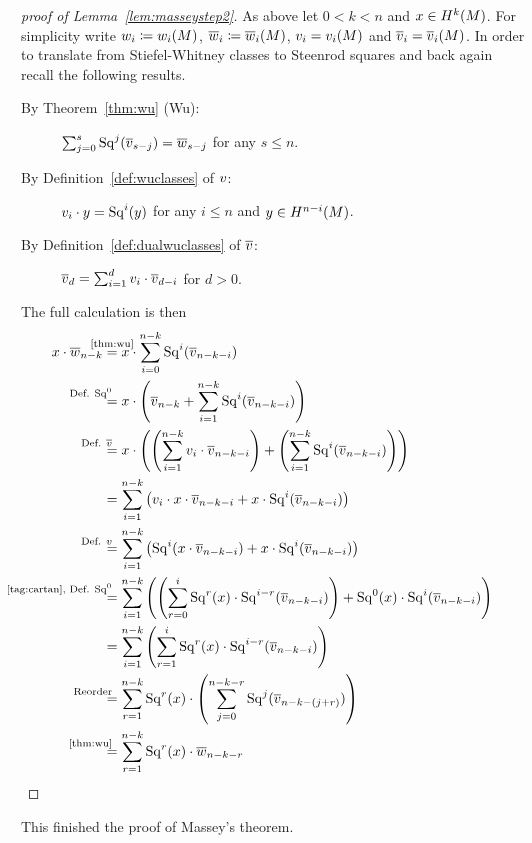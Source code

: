 \begin{proof}[proof of Lemma~\ref{lem:masseystep2}]
  As above let $0<k<n$ and $x\in H^k(M)$.
  For simplicity write
  $w_{i}\coloneqq{w_{i}}(M)$, $\overline{w}_{i}\coloneqq{\overline{w}_{i}}(M)$,
  $v_{i} = {v_{i}}(M)$ and $\overline{v}_{i} = {\overline{v}_{i}}(M)$.
  In order to translate from Stiefel-Whitney classes to Steenrod
  squares and back again recall the following results.
  \begin{description}
  \item[By Theorem~\ref{thm:wu} (Wu):]
    $\sum_{j=0}^{s} \mathrm{Sq}^{j}(\overline{v}_{s-j}) = \overline{w}_{s-j}$
    for any $s\leq n$.
  \item[By Definition~\ref{def:wuclasses} of $v$:]
    $v_{i} \cdot y = \mathrm{Sq}^{i}(y)$
    for any $i\leq n$ and $y\in H^{n-i}(M)$.
  \item[By Definition~\ref{def:dualwuclasses} of $\overline{v}$:]
    $\overline{v}_{d} = \sum_{i=1}^{d} v_{i}\cdot \overline{v}_{d-i}$ for $d>0$.
  \end{description}
  The full calculation is then
  \begin{align*}
    x\cdot \dualws{n-k}
    &\cequalsby{\ref{thm:wu}}
      x\cdot \sum_{i=0}^{n-k} \Sq i(\dualvu{n-k-i}) \\
    &\equalsby{Def. $\Sq 0$}
      x\cdot\left(
      \dualvu{n-k} + \sum_{i=1}^{n-k} \Sq i(\dualvu{n-k-i})
      \right) \\
    &\equalsby{Def. $\dualVu$}
      x\cdot\left(
      \left(\sum_{i=1}^{n-k} \vu{i}\cdot\dualvu{n-k-i}\right)
      + \left(\sum_{i=1}^{n-k} \Sq i(\dualvu{n-k-i})\right)
      \right) \\
    &=
      \sum_{i=1}^{n-k} \left(
      \vu{i}\cdot x\cdot \dualvu{n-k-i}
      + x\cdot \Sq i(\dualvu{n-k-i})
      \right) \\
    &\equalsby{Def. $\Vu$}
      \sum_{i=1}^{n-k} \left(
      \Sq i (x\cdot \dualvu{n-k-i})
      + x\cdot \Sq i(\dualvu{n-k-i})
      \right) \\
    &\equalsby{\ref{tag:cartan}, Def. $\Sq 0$}
      \sum_{i=1}^{n-k} \left(
      \left( \sum_{r=0}^{i} \Sq r(x)\cdot \Sq{i-r}(\dualvu{n-k-i}) \right)
      + \Sq 0(x)\cdot \Sq i(\dualvu{n-k-i})
      \right) \\
    &=
      \sum_{i=1}^{n-k} \left(
      \sum_{r=1}^{i} \Sq r(x)\cdot \Sq{i-r}(\dualvu{n-k-i})
      \right) \\
    &\equalsby{Reorder}
      \sum_{r=1}^{n-k} \Sq r(x) \cdot
      \left( \sum_{j=0}^{n-k-r} \Sq j(\dualvu{n-k-(j+r)}) \right) \\
    &\equalsby{\ref{thm:wu}}
      \sum_{r=1}^{n-k} \Sq r(x) \cdot\dualws{n-k-r}
      \qedhere
  \end{align*}
\end{proof}
This finished the proof of Massey's theorem.


